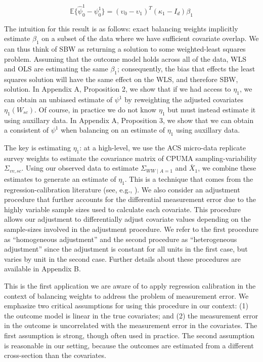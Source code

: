 \documentclass[aoas]{imsart}
\theoremstyle{plain}
\theoremstyle{remark}
\begin{document}
\begin{equation}
\mathbb{E}\{\hat{\psi}^{1}_0 - \psi^1_0\} = (\upsilon_0 - \upsilon_1)^T(\kappa_1 - I_d)\beta_1
\end{equation}

The intuition for this result is as follows: exact balancing weights implicitly estimate $\beta_1$ on a subset of the data where we have sufficient covariate overlap. We can thus think of SBW as returning a solution to some weighted-least squares problem. Assuming that the outcome model holds across all of the data, WLS and OLS are estimating the same $\beta_1$; consequently, the bias that effects the least squares solution will have the same effect on the WLS, and therefore SBW, solution. In Appendix A, Proposition 2, we show that if we had access to $\eta_1$, we can obtain an unbiased estimate of $\psi^1$ by reweighting the adjusted covariates $\eta_1(W_{sc})$. Of course, in practice we do not know $\eta_1$ but must instead estimate it using auxillary data. In Appendix A, Proposition 3, we show that we can obtain a consistent of $\psi^1$ when balancing on an estimate of $\eta_1$ using auxillary data. 

The key is estimating $\eta_1$: at a high-level, we use the ACS micro-data replicate survey weights to estimate the covariance matrix of CPUMA sampling-variability $\Sigma_{vv, sc}$. Using our observed data to estimate $\Sigma_{WW \mid A = 1}$ and $\bar{X}_1$, we combine these estimates to generate an estimate of $\eta_1$. This is a technique that comes from the regression-calibration literature (see, e.g., \cite{gleser1992importance}). We also consider an adjustment procedure that further accounts for the differential measurement error due to the highly variable sample sizes used to calculate each covariate. This procedure allows our adjustment to differentially adjust covariate values depending on the sample-sizes involved in the adjustment procedure. We refer to the first procedure as ``homogeneous adjustment'' and the second procedure as ``heterogeneous adjustment'' since the adjustment is constant for all units in the first case, but varies by unit in the second case. Further details about these procedures are available in Appendix B. 

This is the first application we are aware of to apply regression calibration in the context of balancing weights to address the problem of measurement error. We emphasize two critical assumptions for using this procedure in our context: (1) the outcome model is linear in the true covariates; and (2) the measurement error in the outcome is uncorrelated with the measurement error in the covariates. The first assumption is strong, though often used in practice. The second assumption is reasonable in our setting, because the outcomes are estimated from a different cross-section than the covariates. 
\end{document}
